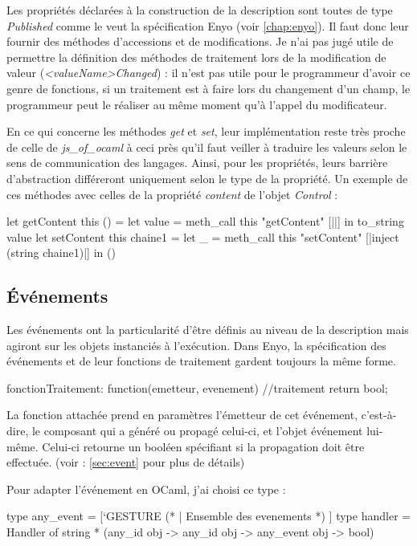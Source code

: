 \documentclass[11pt,a4paper]{report}
\begin{document}
Les propriétés déclarées à la construction de la description sont toutes de type \emph{Published}
comme le veut la spécification Enyo (voir \ref{chap:enyo}). Il faut donc leur fournir
des méthodes d'accessions et de modifications. Je n'ai pas jugé utile de permettre la définition
des méthodes de traitement lors de la modification de valeur (\emph{<valueName>Changed}) : 
il n'est pas utile pour le programmeur d'avoir ce genre de fonctions, si un traitement est à faire
lors du changement d'un champ, le programmeur peut le réaliser au même moment qu'à l'appel du
modificateur.

En ce qui concerne les méthodes \emph{get} et \emph{set}, leur implémentation reste très proche
de celle de \emph{js\_of\_ocaml} à ceci près qu'il faut veiller à traduire les valeurs selon le
sens de communication des langages.
Ainsi, pour les propriétés, leurs barrière d'abstraction différeront uniquement selon le type 
de la propriété. Un exemple de ces méthodes avec celles de la propriété \emph{content} 
de l'objet \emph{Control} :

\begin{OCaml}
  let getContent this () =
	let value = meth_call this "getContent" [||] in
		to_string value
  let setContent this chaine1 =
	let _ = meth_call this "setContent" [|inject (string chaine1)|] in
		()
\end{OCaml}

\subsection{\'Evénements}

Les événements ont la particularité d'être définis au niveau de la description mais agiront sur les objets
instanciés à l'exécution. Dans Enyo, la spécification des événements et de leur fonctions 
de traitement gardent toujours la même forme.

\begin{JavaScript}
  fonctionTraitement: function(emetteur, evenement){
                          //traitement
                          return bool; }
\end{JavaScript}

La fonction attachée prend en paramètres l'émetteur de cet événement, c'est-à-dire, 
le composant qui a généré ou propagé celui-ci, et l'objet événement lui-même.
Celui-ci retourne un booléen spécifiant si la propagation doit être effectuée.
(voir : \ref{sec:event} pour plus de détails)

Pour adapter l'événement en OCaml, j'ai choisi ce type :
\begin{OCaml}
  type any_event = [`GESTURE (* |  Ensemble des evenements *) ]
  type handler = Handler of string * (any_id obj -> any_id obj -> any_event obj -> bool)
\end{OCaml}
\end{document}
